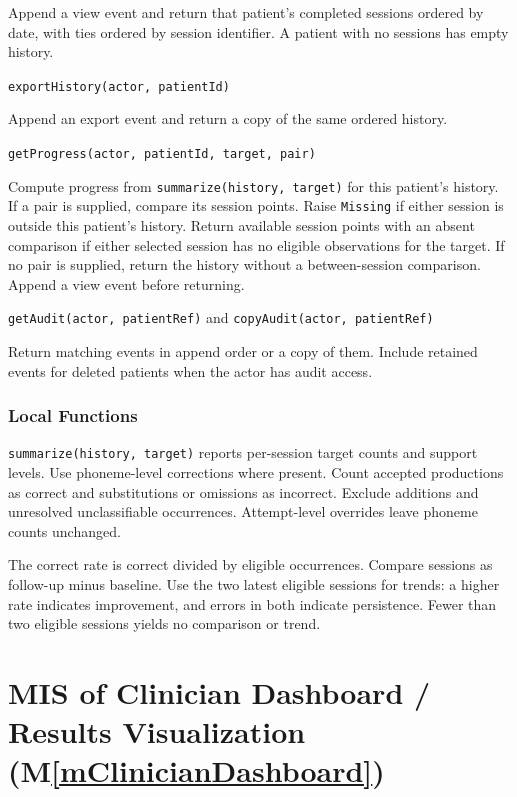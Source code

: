 \documentclass[12pt, titlepage]{article}
\newcommand{\mref}[1]{M\ref{#1}}
\begin{document}
\begin{description}
Append a view event and return
that patient's completed sessions ordered by date, with ties ordered by
session identifier. A patient with no sessions has empty history.
\item[] \texttt{exportHistory(actor, patientId)}\par
Append an export event and
return a copy of the same ordered history.
\item[] \texttt{getProgress(actor, patientId, target, pair)}\par
Compute progress
from \texttt{summarize(history, target)} for this patient's history. If a
pair is supplied, compare its session points. Raise \texttt{Missing} if
either session is outside this patient's history. Return available session
points with an absent comparison if either selected session has no eligible
observations for the target. If no pair is supplied, return the history
without a between-session comparison. Append a view event before returning.
\item[] \texttt{getAudit(actor, patientRef)} and \texttt{copyAudit(actor, patientRef)}\par
Return matching events in append order or a copy of them. Include retained
events for deleted patients when the actor has audit access.
\end{description}

\subsubsection{Local Functions}
\texttt{summarize(history, target)} reports per-session target counts and
support levels. Use phoneme-level corrections where present. Count accepted
productions as correct and substitutions or omissions as incorrect. Exclude
additions and unresolved unclassifiable occurrences. Attempt-level overrides
leave phoneme counts unchanged.

The correct rate is correct divided by eligible occurrences. Compare sessions
as follow-up minus baseline. Use the two latest eligible sessions for trends:
a higher rate indicates improvement, and errors in both indicate persistence.
Fewer than two eligible sessions yields no comparison or trend.

\clearpage

\section{MIS of Clinician Dashboard / Results Visualization (\mref{mClinicianDashboard})} \label{mis:dashboard}
\end{document}

